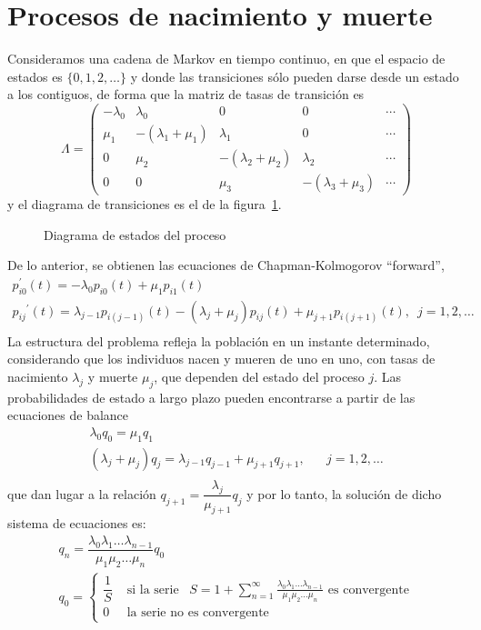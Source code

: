 \section{Procesos de nacimiento y muerte}
Consideramos una cadena de Markov en tiempo continuo, en que el
espacio de estados es $\{0,1,2,\ldots\}$ y donde las transiciones
s\'{o}lo pueden darse desde un estado a los contiguos, de forma que la
matriz de tasas de transici\'{o}n es
\[
\Lambda=
\begin{pmatrix}
  -\lambda_0 & \lambda_0  &     0 & 0 & \cdots \\
   \mu_1   &-(\lambda_1+\mu_1)& \lambda_1 &  0&\cdots \\
      0    & \mu_2      & -(\lambda_2+\mu_2)&\lambda_2  & \cdots \\
    0       &  0        &\mu_3  & -(\lambda_3+\mu_3) & \cdots
\end{pmatrix}
\]
y el diagrama de transiciones es el de la figura~\ref{nacimiento}.
\begin{figure}
\centerline{}
\caption[]{Diagrama de estados del proceso} \label{nacimiento}
\end{figure}
De lo anterior, se obtienen las ecuaciones de Chapman-Kolmogorov
``forward'',
\[
\begin{array}{l}
 p^\prime_{i0}(t)=-\lambda_0 p_{i0}(t)+\mu_1 p_{i1}(t)\\
%
{p_{ij}}^\prime(t)=\lambda_{j-1}p_{i(j-1)}(t)-(\lambda_j+\mu_j)
p_{ij}(t)+\mu_{j+1}p_{i(j+1)}(t),\enspace j=1,2,\ldots\\
\end{array}
\]
La estructura del problema refleja la poblaci\'{o}n en un instante
determinado, considerando que los individuos nacen y mueren de
uno en uno, con tasas de nacimiento $\lambda_j$ y muerte $\mu_j$,
que dependen del estado del proceso $j$. Las probabilidades de
estado a largo plazo pueden encontrarse a partir de las
ecuaciones de balance
\[
\begin{array}{l}
 \lambda_0 q_0=\mu_1 q_1\\
%
(\lambda_j+\mu_j)q_j=\lambda_{j-1}q_{j-1}+\mu_{j+1}q_{j+1},\hspace{20pt} j=1,2,\ldots\\
\end{array}
\]
que dan lugar a la relaci\'{o}n
$q_{j+1}=\dfrac{\lambda_j}{\mu_{j+1}}q_j$ y por lo tanto, la
soluci\'{o}n de dicho sistema de ecuaciones es:
\[
\begin{array}{l}
q_n=\dfrac{\lambda_0 \lambda_1\ldots \lambda_{n-1}}{\mu_1 \mu_2
\ldots \mu_n}q_0\\[10pt]
q_0=\left\{
\begin{array}{ll}
\dfrac{1}{S}& \text{ si la serie }\enspace
S=1+\displaystyle\sum_{n=1}^\infty \frac{\lambda_0
\lambda_1\ldots \lambda_{n-1}}{\mu_1 \mu_2 \ldots
\mu_n} \text{ es convergente}\\[5pt]
0&\text{ la serie no es convergente }
\end{array}
\right.
\end{array}
\]

